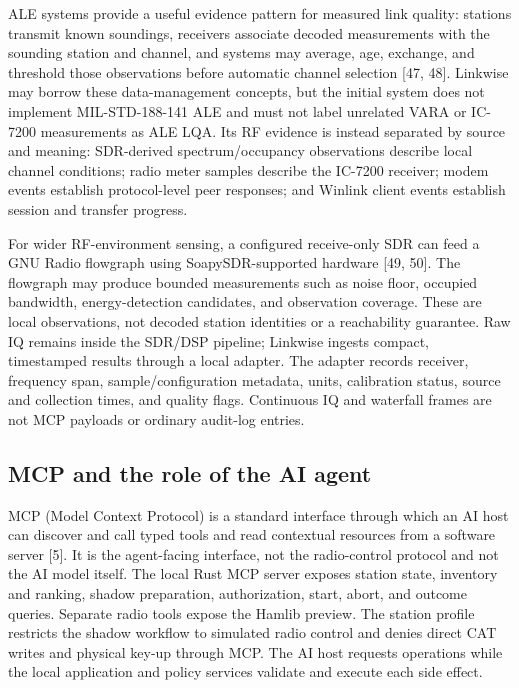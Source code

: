 \documentclass[11pt,a4paper]{article}
\begin{document}
ALE systems provide a useful evidence pattern for measured link quality:
stations transmit known soundings, receivers associate decoded measurements
with the sounding station and channel, and systems may average, age, exchange,
and threshold those observations before automatic channel selection [47,
48]. Linkwise may borrow these data-management concepts, but the initial
system does not implement MIL-STD-188-141 ALE and must not label unrelated
VARA or IC-7200 measurements as ALE LQA. Its RF evidence is instead separated
by source and meaning: SDR-derived spectrum/occupancy observations describe
local channel conditions; radio meter samples describe the IC-7200 receiver;
modem events establish protocol-level peer responses; and Winlink client
events establish session and transfer progress.

For wider RF-environment sensing, a configured receive-only SDR can feed a
GNU Radio flowgraph using SoapySDR-supported hardware [49, 50]. The flowgraph
may produce bounded measurements such as noise floor, occupied bandwidth,
energy-detection candidates, and observation coverage. These are local
observations, not decoded station identities or a reachability guarantee.
Raw IQ remains inside the SDR/DSP pipeline; Linkwise ingests compact,
timestamped results through a local adapter. The adapter records receiver,
frequency span, sample/configuration metadata, units, calibration status,
source and collection times, and quality flags. Continuous IQ and waterfall
frames are not MCP payloads or ordinary audit-log entries.

\subsection{MCP and the role of the AI agent}
MCP (Model Context Protocol) is a standard interface through which an AI host
can discover and call typed tools and read contextual resources from a
software server [5]. It is the agent-facing interface, not the radio-control
protocol and not the AI model itself. The local Rust MCP server exposes
station state, inventory and ranking, shadow preparation, authorization,
start, abort, and outcome queries. Separate radio tools expose the Hamlib
preview. The station profile restricts the shadow workflow to simulated
radio control and denies direct CAT writes and physical key-up through MCP.
The AI host requests operations while the local application and policy
services validate and execute each side effect.
\end{document}
